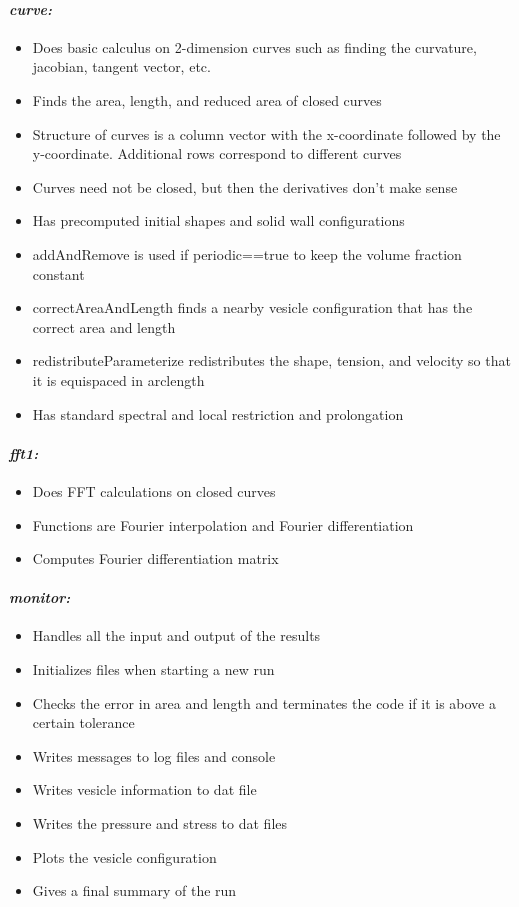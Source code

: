 \documentclass[12pt]{article}
\begin{document}
\paragraph{\emph{curve:}}
\begin{itemize}
\item Does basic calculus on 2-dimension curves such as finding the curvature,
jacobian, tangent vector, etc.
\item Finds the area, length, and reduced area of closed curves
\item Structure of curves is a column vector with the x-coordinate
followed by the y-coordinate.  Additional rows correspond to different
curves
\item Curves need not be closed, but then the derivatives don't make
sense 
\item Has precomputed initial shapes and solid wall configurations
\item addAndRemove is used if periodic==true to keep the volume fraction
constant
\item correctAreaAndLength finds a nearby vesicle configuration that has
the correct area and length
\item redistributeParameterize redistributes the shape, tension, and
velocity so that it is equispaced in arclength
\item Has standard spectral and local restriction and prolongation
\end{itemize}

\paragraph{\emph{fft1:}}
\begin{itemize}
\item Does FFT calculations on closed curves
\item Functions are Fourier interpolation and Fourier differentiation
\item Computes Fourier differentiation matrix
\end{itemize}

\paragraph{\emph{monitor:}}
\begin{itemize}
\item Handles all the input and output of the results
\item Initializes files when starting a new run
\item Checks the error in area and length and terminates the code if it
is above a certain tolerance
\item Writes messages to log files and console
\item Writes vesicle information to dat file
\item Writes the pressure and stress to dat files
\item Plots the vesicle configuration
\item Gives a final summary of the run
\end{itemize}
\end{document}
